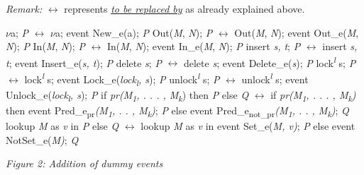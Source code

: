 \documentclass[11pt]{article}
\begin{document}
\vspace{8pt}
{\it Remark: }$\leftrightarrow$ represents \underline{{\it to be replaced by}} as already explained above. 
\vspace{8pt}
\begin{center}
        $\nu$a; {\it P} $\leftrightarrow$ $\nu$a; event New\_e(a); {\it P}\newline\newline
    Out({\it M}, {\it N}); {\it P} $\leftrightarrow$ Out({\it M}, {\it N}); event Out\_e({\it M}, {\it N}); {\it P} \newline\newline
    In({\it M}, {\it N}); {\it P} $\leftrightarrow$ In({\it M}, {\it N}); event In\_e({\it M}, {\it N}); {\it P} \newline\newline
    insert {\it s, t}; {\it P} $\leftrightarrow$ insert {\it s, t}; event Insert\_e({\it s, t}); {\it P} \newline\newline 
    delete {\it s}; {\it P} $\leftrightarrow$ delete {\it s}; event Delete\_e({\it s}); {\it P} \newline\newline 
    lock\textsuperscript{{\it l}} s; {\it P} $\leftrightarrow$ lock\textsuperscript{{\it l}} s; event Lock\_e({\it lock\textsubscript{l}, s}); {\it P} \newline\newline
    unlock\textsuperscript{{\it l}} s; {\it P} $\leftrightarrow$ unlock\textsuperscript{{\it l}} s; event Unlock\_e({\it lock\textsubscript{l}, s}); {\it P} \newline\newline
    if {\it pr(M\textsubscript{1}, . . . , M\textsubscript{k}}) then {\it P} else {\it Q} $\leftrightarrow$ if {\it pr(M\textsubscript{1}, . . . , M\textsubscript{k})} then event Pred\_e\textsubscript{pr}{\it (M\textsubscript{1}, . . , M\textsubscript{k})}; {\it P} else event Pred\_e\textsubscript{not\_pr}{\it (M\textsubscript{1}, . . , M\textsubscript{k})}; {\it Q}\newline\newline  
    lookup {\it M} as {\it v} in {\it P} else {\it Q} $\leftrightarrow$ lookup {\it M} as {\it v} in event Set\_e({\it M, v)}; {\it P} else event NotSet\_e({\it M)}; {\it Q}\newline
    
    \vspace{10pt}
    {\it Figure 2: Addition of dummy events}
\end{center}
\end{document}
